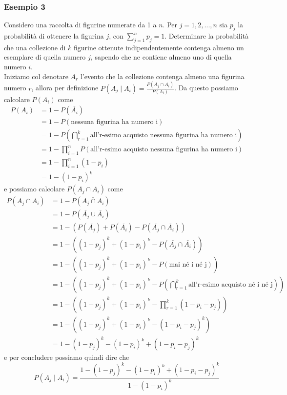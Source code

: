 \documentclass[11pt]{report}
\begin{document}
\subsubsection{Esempio 3}
Considero una raccolta di figurine numerate da 1 a $n$. Per $j = 1, 2,..., n$ sia $p_j$ la probabilità di ottenere la figurina $j$, con $\sum_{j=1}^{n}p_j = 1$. Determinare la probabilità che una collezione di $k$ figurine ottenute indipendentemente contenga almeno un esemplare di quella numero $j$, sapendo che ne contiene almeno uno di quella numero $i$.\\
Iniziamo col denotare $A_r$ l'evento che la collezione contenga almeno una figurina numero $r$, allora per definizione $P(A_j \mid A_i) = \frac{P(A_j \cap A_i)}{P(A_i)}$. Da questo possiamo calcolare $P(A_i)$ come
\begin{equation}
    \begin{split}
        P(A_i) & = 1 - P(\overline{A_i})\\
        & = 1 - P(\text{nessuna figurina ha numero i})\\
        & = 1 - P \left( \bigcap_{r=1}^{k}\text{all'r-esimo acquisto nessuna figurina ha numero i} \right )\\
        & = 1 - \prod_{i=1}^{n}P(\text{all'r-esimo acquisto nessuna figurina ha numero i})\\
        & = 1 - \prod_{i=1}^{n}(1 - p_i)\\
        & = 1 - (1 - p_i)^k
    \end{split}
\end{equation}
e possiamo calcolare $P(A_j \cap A_i)$ come
\begin{equation}
    \begin{split}
        P(A_j \cap A_i) & = 1 - P(\overline{A_j \cap A_i})\\
        & = 1 - P(\overline{A_j} \cup \overline{A_i})\\
        & = 1 - (P(\overline{A_j}) + P(\overline{A_i}) - P(\overline{A_j} \cap \overline{A_i}))\\
        & = 1 - ((1 - p_j)^k + (1 - p_i)^k - P(\overline{A_j} \cap \overline{A_i}))\\
        & = 1 - ((1 - p_j)^k + (1 - p_i)^k - P(\text{mai né i né j}))\\
        & = 1 - \left((1 - p_j)^k + (1 - p_i)^k - P\left(\bigcap_{r=1}^{k}\text{all'r-esimo acquisto né i né j}\right)\right)\\
        & = 1 - \left( (1 - p_j)^k + (1 - p_i)^k - \prod_{r=1}^{k}(1 - p_i - p_j) \right )\\
        & = 1 - ((1 - p_j)^k + (1 - p_i)^k - (1 - p_i - p_j)^k)\\
        & = 1 - (1 - p_j)^k - (1 - p_i)^k + (1 - p_i - p_j)^k
    \end{split}
\end{equation}
e per concludere possiamo quindi dire che
\begin{equation}
    P(A_j \mid A_i) = \frac{1 - (1 - p_j)^k - (1 - p_i)^k + (1 - p_i - p_j)^k}{1 - (1 - p_i)^k}
\end{equation}
\end{document}
